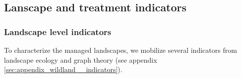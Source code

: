 %
%
\subsection{Lanscape and treatment indicators}
\label{section:indicators}
\subsubsection{Landscape level indicators}
To characterize the managed landscapes, we mobilize several indicators from landscape ecology and graph theory (see appendix \ref{sec:appendix_wildland__indicators}).

